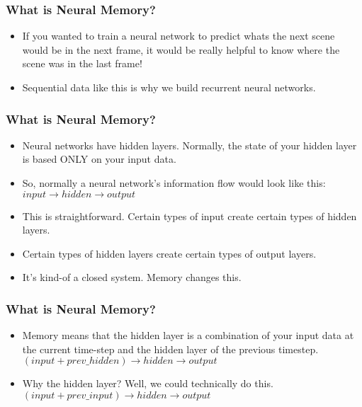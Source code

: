 \begin{frame}[fragile] \frametitle{What is Neural Memory?}

\begin{itemize}
\item If you wanted to train a neural network to predict whats the next scene would be in the next frame, it would be really helpful to know where the scene was in the last frame! 
\item Sequential data like this is why we build recurrent neural networks.
\end{itemize}
\end{frame}

\begin{frame}[fragile] \frametitle{What is Neural Memory?}

\begin{itemize}
\item Neural networks have hidden layers. Normally, the state of your hidden layer is based ONLY on your input data. 
\item So, normally a neural network's information flow would look like this:
$input \rightarrow hidden  \rightarrow  output$
\item This is straightforward. Certain types of input create certain types of hidden layers. 
\item Certain types of hidden layers create certain types of output layers. 
\item It's kind-of a closed system. Memory changes this. 
\end{itemize}
\end{frame}


\begin{frame}[fragile] \frametitle{What is Neural Memory?}
\begin{itemize}
\item Memory means that the hidden layer is a combination of your input data at the current time-step and the hidden layer of the previous timestep.
$ (input + prev\_hidden) \rightarrow hidden \rightarrow output$
\item Why the hidden layer? Well, we could technically do this. 
$(input + prev\_input) \rightarrow hidden \rightarrow output$
\end{itemize}
\end{frame}

